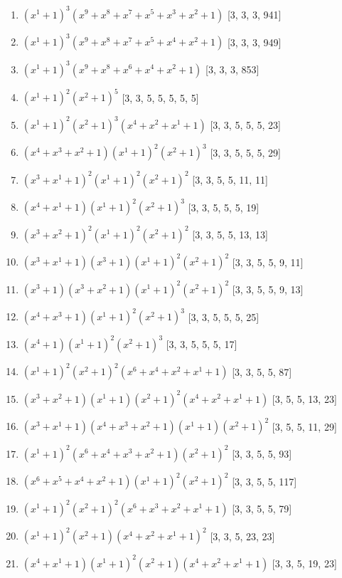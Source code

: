 \documentclass[10pt,twocolumn]{article}
\begin{document}
\begin{enumerate}
\item $(x^{1} + 1)^{3}(x^{9} + x^{8} + x^{7} + x^{5} + x^{3} + x^{2} + 1)$  [3, 3, 3, 941]
\item $(x^{1} + 1)^{3}(x^{9} + x^{8} + x^{7} + x^{5} + x^{4} + x^{2} + 1)$  [3, 3, 3, 949]
\item $(x^{1} + 1)^{3}(x^{9} + x^{8} + x^{6} + x^{4} + x^{2} + 1)$  [3, 3, 3, 853]
\item $(x^{1} + 1)^{2}(x^{2} + 1)^{5}$  [3, 3, 5, 5, 5, 5, 5]
\item $(x^{1} + 1)^{2}(x^{2} + 1)^{3}(x^{4} + x^{2} + x^{1} + 1)$  [3, 3, 5, 5, 5, 23]
\item $(x^{4} + x^{3} + x^{2} + 1)(x^{1} + 1)^{2}(x^{2} + 1)^{3}$  [3, 3, 5, 5, 5, 29]
\item $(x^{3} + x^{1} + 1)^{2}(x^{1} + 1)^{2}(x^{2} + 1)^{2}$  [3, 3, 5, 5, 11, 11]
\item $(x^{4} + x^{1} + 1)(x^{1} + 1)^{2}(x^{2} + 1)^{3}$  [3, 3, 5, 5, 5, 19]
\item $(x^{3} + x^{2} + 1)^{2}(x^{1} + 1)^{2}(x^{2} + 1)^{2}$  [3, 3, 5, 5, 13, 13]
\item $(x^{3} + x^{1} + 1)(x^{3} + 1)(x^{1} + 1)^{2}(x^{2} + 1)^{2}$  [3, 3, 5, 5, 9, 11]
\item $(x^{3} + 1)(x^{3} + x^{2} + 1)(x^{1} + 1)^{2}(x^{2} + 1)^{2}$  [3, 3, 5, 5, 9, 13]
\item $(x^{4} + x^{3} + 1)(x^{1} + 1)^{2}(x^{2} + 1)^{3}$  [3, 3, 5, 5, 5, 25]
\item $(x^{4} + 1)(x^{1} + 1)^{2}(x^{2} + 1)^{3}$  [3, 3, 5, 5, 5, 17]
\item $(x^{1} + 1)^{2}(x^{2} + 1)^{2}(x^{6} + x^{4} + x^{2} + x^{1} + 1)$  [3, 3, 5, 5, 87]
\item $(x^{3} + x^{2} + 1)(x^{1} + 1)(x^{2} + 1)^{2}(x^{4} + x^{2} + x^{1} + 1)$  [3, 5, 5, 13, 23]
\item $(x^{3} + x^{1} + 1)(x^{4} + x^{3} + x^{2} + 1)(x^{1} + 1)(x^{2} + 1)^{2}$  [3, 5, 5, 11, 29]
\item $(x^{1} + 1)^{2}(x^{6} + x^{4} + x^{3} + x^{2} + 1)(x^{2} + 1)^{2}$  [3, 3, 5, 5, 93]
\item $(x^{6} + x^{5} + x^{4} + x^{2} + 1)(x^{1} + 1)^{2}(x^{2} + 1)^{2}$  [3, 3, 5, 5, 117]
\item $(x^{1} + 1)^{2}(x^{2} + 1)^{2}(x^{6} + x^{3} + x^{2} + x^{1} + 1)$  [3, 3, 5, 5, 79]
\item $(x^{1} + 1)^{2}(x^{2} + 1)(x^{4} + x^{2} + x^{1} + 1)^{2}$  [3, 3, 5, 23, 23]
\item $(x^{4} + x^{1} + 1)(x^{1} + 1)^{2}(x^{2} + 1)(x^{4} + x^{2} + x^{1} + 1)$  [3, 3, 5, 19, 23]

\end{enumerate}
\end{document}
